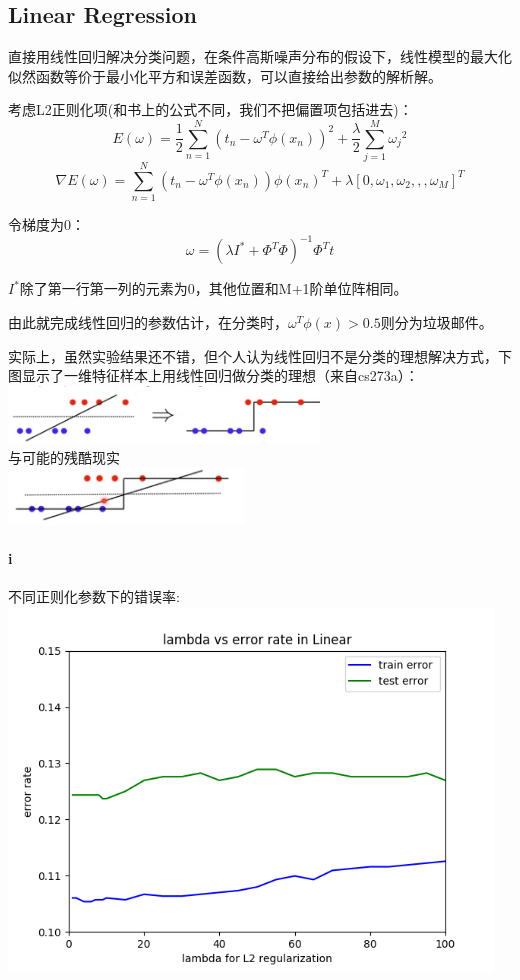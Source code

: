 \documentclass[hyperref,UTF8]{ctexart}
\begin{document}
\subsection{Linear Regression}
直接用线性回归解决分类问题，在条件高斯噪声分布的假设下，线性模型的最大化似然函数等价于最小化平方和误差函数，可以直接给出参数的解析解。
\par 考虑L2正则化项(和书上的公式不同，我们不把偏置项包括进去)：
\[E(\omega)=\frac{1}{2}\sum_{n=1}^{N}(t_n-{\omega}^T\phi(x_n))^2 + \frac{\lambda}{2}\sum_{j=1}^{M}{\omega_j}^2\]
\[\nabla E(\omega)=\sum_{n=1}^{N}(t_n-{\omega}^T\phi(x_n))\phi(x_n)^T + \lambda[0,\omega_1,\omega_2,,,\omega_M]^T\]
\par 令梯度为0：
\[\omega=(\lambda I^{*} +\Phi^T \Phi)^{-1} \Phi^T t\]
\par $I^{*}$除了第一行第一列的元素为0，其他位置和M+1阶单位阵相同。
\par 由此就完成线性回归的参数估计，在分类时，$\omega^T\phi(x)> 0.5$则分为垃圾邮件。
\par 实际上，虽然实验结果还不错，但个人认为线性回归不是分类的理想解决方式，下图显示了一维特征样本上用线性回归做分类的理想（来自cs273a）：\\
\includegraphics[height=0.6in]{lingood.png}
\\与可能的残酷现实\\
\includegraphics[height=0.6in]{linbad.png}
\paragraph{i}
\par 不同正则化参数下的错误率:\\
\includegraphics[height=3.8in]{Linear-lam.png}
\end{document}
